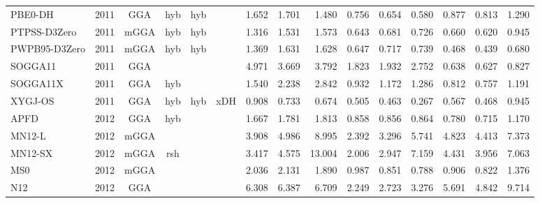 \begin{landscape}
\begin{longtable}{lcccccrrrrrrrrr}
    PBE0-DH          & 2011 & GGA  & hyb      & hyb         &           & 1.652             & 1.701             & 1.480  & 0.756              & 0.654             & 0.580  & 0.877   & 0.813 & 1.290 \\
    PTPSS-D3Zero     & 2011 & mGGA & hyb      & hyb         &           & 1.316             & 1.531             & 1.573  & 0.643              & 0.681             & 0.726  & 0.660   & 0.620 & 0.945 \\
    PWPB95-D3Zero    & 2011 & mGGA & hyb      & hyb         &           & 1.369             & 1.631             & 1.628  & 0.647              & 0.717             & 0.739  & 0.468   & 0.439 & 0.680 \\
    SOGGA11          & 2011 & GGA  &          &             &           & 4.971             & 3.669             & 3.792  & 1.823              & 1.932             & 2.752  & 0.638   & 0.627 & 0.827 \\
    SOGGA11X         & 2011 & GGA  & hyb      &             &           & 1.540             & 2.238             & 2.842  & 0.932              & 1.172             & 1.286  & 0.812   & 0.757 & 1.191 \\
    XYGJ-OS          & 2011 & GGA  & hyb      & hyb         & xDH       & 0.908             & 0.733             & 0.674  & 0.505              & 0.463             & 0.267  & 0.567   & 0.468 & 0.945 \\
    APFD             & 2012 & GGA  & hyb      &             &           & 1.667             & 1.781             & 1.813  & 0.858              & 0.856             & 0.864  & 0.780   & 0.715 & 1.170 \\
    MN12-L           & 2012 & mGGA &          &             &           & 3.908             & 4.986             & 8.995  & 2.392              & 3.296             & 5.741  & 4.823   & 4.413 & 7.373 \\
    MN12-SX          & 2012 & mGGA & rsh      &             &           & 3.417             & 4.575             & 13.004 & 2.006              & 2.947             & 7.159  & 4.431   & 3.956 & 7.063 \\
    MS0              & 2012 & mGGA &          &             &           & 2.036             & 2.131             & 1.890  & 0.987              & 0.851             & 0.788  & 0.906   & 0.822 & 1.376 \\
    N12              & 2012 & GGA  &          &             &           & 6.308             & 6.387             & 6.709  & 2.249              & 2.723             & 3.276  & 5.691   & 4.842 & 9.714 \\

\end{longtable}
\end{landscape}
